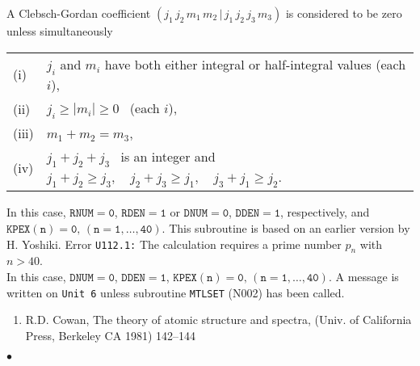 \Notes
A Clebsch-Gordan coefficient
$(j_1\,j_2\,m_1\,m_2\,|\,j_1\,j_2\,j_3\,m_3)$
is considered to be zero unless simultaneously \\
\begin{tabular}[t]{ll}
(i) & $j_i$ and $m_i$ have both either integral or half-integral
values (each $i$), \\
(ii) & $j_i \ge |m_i| \ge 0$ \ (each $i$), \\
(iii) & $m_1+m_2=m_3$, \\
(iv) & $j_1+j_2+j_3$ \ is an integer and \
$j_1+j_2 \ge j_3, \quad j_2+j_3 \ge j_1, \quad j_3+j_1 \ge j_2$.
\end{tabular}
\par
In this case, $\mathtt{RNUM = 0}$, $\mathtt{RDEN = 1}$ or
$\mathtt{DNUM = 0}$, $\mathtt{DDEN = 1}$, respectively, and
$\mathtt{KPEX(n) = 0,\,(n=1,\ldots,40)}$.
\newpage
\Source
This subroutine is based on an earlier version by H. Yoshiki.
\Errorh
Error {\tt U112.1:} The calculation requires a prime number $p_n$ with
$n>40$. \\
In this case, $\mathtt{DNUM = 0}$, $\mathtt{DDEN = 1}$,
$\mathtt{KPEX(n) = 0,\,(n=1,\ldots,40)}$. A message is written on
{\tt Unit 6} unless subroutine {\tt MTLSET} (N002) has been called.
\Refer
\begin{enumerate}
\item R.D. Cowan, The theory of atomic structure and spectra,
(Univ. of California Press, Berkeley CA 1981) 142--144
\end{enumerate}
$\bullet$
